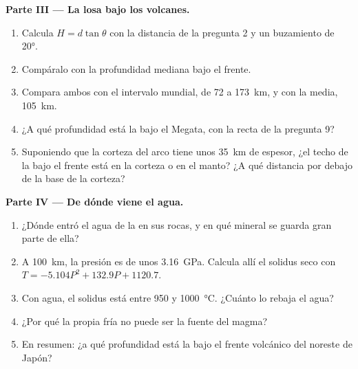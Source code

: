 \begin{problem}
\medskip
\noindent\textbf{Parte III --- La losa bajo los volcanes.}
\begin{enumerate}[resume]
  \item Calcula $H = d\tan\theta$ con la distancia de la pregunta 2 y un
        buzamiento de \ang{20}.
  \item Compáralo con la profundidad mediana bajo el frente.
  \item Compara ambos con el intervalo mundial, de 72 a \qty{173}{km}, y con
        la media, \qty{105}{km}.
  \item ¿A qué profundidad está la  bajo el Megata, con la recta de la
        pregunta 9?
  \item Suponiendo que la corteza del arco tiene unos \qty{35}{km} de
        espesor, ¿el techo de la  bajo el frente está en la corteza o en
        el manto? ¿A qué distancia por debajo de la base de la corteza?
\end{enumerate}

\medskip
\noindent\textbf{Parte IV --- De dónde viene el agua.}
\begin{enumerate}[resume]
  \item ¿Dónde entró el agua de la  en sus rocas, y en qué mineral se
        guarda gran parte de ella?
  \item A \qty{100}{km}, la presión es de unos \qty{3.16}{GPa}. Calcula allí
        el solidus seco con $T = -5.104P^2 + 132.9P + 1120.7$.
  \item Con agua, el solidus está entre 950 y \qty{1000}{\celsius}.
        ¿Cuánto lo rebaja el agua?
  \item ¿Por qué la propia  fría no puede ser la fuente del magma?
  \item En resumen: ¿a qué profundidad está la  bajo el frente volcánico
        del noreste de Japón?
\end{enumerate}
\end{problem}
